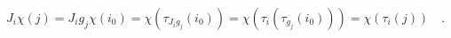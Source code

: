 \begin{equation}
J_i \chi(j) = J_i g_j \chi(i_0) = \chi(\tau_{J_i g_j}(i_0)) =
\chi(\tau_i(\tau_{g_j}(i_0))) = \chi(\tau_i(j)) \quad . \label{cov}
\end{equation}

